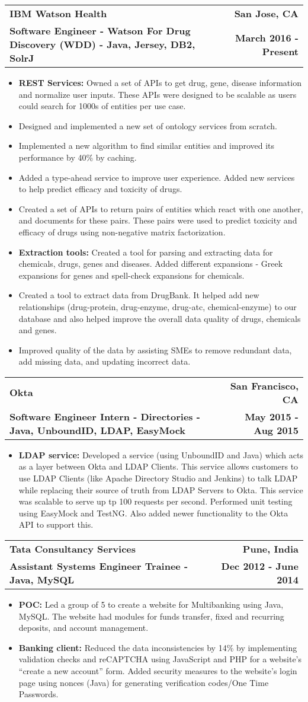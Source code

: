 \documentclass[letterpaper,10pt]{article}
\makeatletter
\newcommand{\resumeItem}[2]{
  \item\small{
    \textbf{#1}{#2 \vspace{-2pt}}
  }
}
\newcommand{\resumeSubheading}[4]{
  \vspace{-1pt}\item
    \begin{tabular*}{0.97\textwidth}{l@{\extracolsep{\fill}}r}
      \textbf{#1} & \textbf{#2} \\
      \textbf{\small#3} & \textbf{\small #4} \\
    \end{tabular*}\vspace{-5pt}
}
\newcommand{\resumeItemListStart}{\begin{itemize}}
\newcommand{\resumeItemListEnd}{\end{itemize}\vspace{-5pt}}
\makeatother
\begin{document}
    \resumeSubheading
      {IBM Watson Health}{San Jose, CA}
      {Software Engineer - Watson For Drug Discovery (WDD) - Java, Jersey, DB2, SolrJ }{March 2016 - Present}
      \resumeItemListStart
        \resumeItem{REST Services: }{Owned a set of APIs to get drug, gene, disease information and normalize user inputs. These APIs were designed to be scalable as users could search for 1000s of entities per use case.}
        \resumeItem{}{Designed and implemented a new set of ontology services from scratch.} 
        \resumeItem{}{Implemented a new algorithm to find similar entities and improved its performance by 40\% by caching. }
        \resumeItem{}{Added a type-ahead service to improve user experience. Added new services to help predict efficacy and toxicity of drugs. }
        \resumeItem{}{Created a set of APIs to return pairs of entities which react with one another, and documents for these pairs. These pairs were used to predict toxicity and efficacy of drugs using non-negative matrix factorization.}
        \resumeItem{Extraction tools: }{Created a tool for parsing and extracting data for chemicals, drugs, genes and diseases. Added different expansions - Greek expansions for genes and spell-check expansions for chemicals.}
        \resumeItem{}{Created a tool to extract data from DrugBank. It helped add new relationships (drug-protein, drug-enzyme, drug-atc, chemical-enzyme) to our database and also helped improve the overall data quality of drugs, chemicals and genes.}
        \resumeItem{}{Improved quality of the data by assisting SMEs to remove redundant data, add missing data, and updating incorrect data.}
      \resumeItemListEnd

    \resumeSubheading
      {Okta}{San Francisco, CA}
      {Software Engineer Intern - Directories - Java, UnboundID, LDAP, EasyMock}{May 2015 - Aug 2015}
      \resumeItemListStart
        \resumeItem{LDAP service: }
          {Developed a service (using UnboundID and Java) which acts as a layer between Okta and LDAP Clients. This service allows customers to use LDAP Clients (like Apache Directory Studio and Jenkins) to talk LDAP while replacing their source of truth from LDAP Servers to Okta. This service was scalable to serve up tp 100 requests per second. Performed unit testing using EasyMock and TestNG. Also added newer functionality to the Okta API to support this.}
      \resumeItemListEnd

    \resumeSubheading
      {Tata Consultancy Services}{Pune, India}
      {Assistant Systems Engineer Trainee - Java, MySQL}{Dec 2012 - June 2014}
      \resumeItemListStart
        \resumeItem{POC: } {Led a group of 5 to create a website for Multibanking using Java, MySQL. The website had modules for funds transfer, fixed and recurring deposits, and account management.}
        \resumeItem{Banking client: } {Reduced the data inconsistencies by 14\% by implementing validation checks and reCAPTCHA using JavaScript and PHP for a website’s “create a new account” form. Added security measures to the website’s login page using nonces (Java) for generating verification codes/One Time Passwords.}
      \resumeItemListEnd
\end{document}
